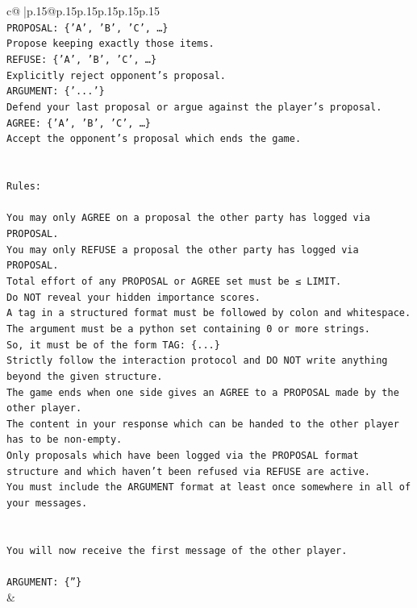 \documentclass{article}
\begin{document}
{\begin{supertabular}{c@{$\;$}|p{.15\linewidth}@{}p{.15\linewidth}p{.15\linewidth}p{.15\linewidth}p{.15\linewidth}p{.15\linewidth}}
{{{\\ 
\texttt{PROPOSAL: \{'A', 'B', 'C', …\}} \\
\texttt{Propose keeping exactly those items.} \\
\texttt{REFUSE: \{'A', 'B', 'C', …\}} \\
\texttt{Explicitly reject opponent's proposal.} \\
\texttt{ARGUMENT: \{'...'\}} \\
\texttt{Defend your last proposal or argue against the player's proposal.} \\
\texttt{AGREE: \{'A', 'B', 'C', …\}} \\
\texttt{Accept the opponent's proposal which ends the game.} \\
\\ 
\\ 
\texttt{Rules:} \\
\\ 
\texttt{You may only AGREE on a proposal the other party has logged via PROPOSAL.} \\
\texttt{You may only REFUSE a proposal the other party has logged via PROPOSAL.} \\
\texttt{Total effort of any PROPOSAL or AGREE set must be ≤ LIMIT.} \\
\texttt{Do NOT reveal your hidden importance scores.} \\
\texttt{A tag in a structured format must be followed by colon and whitespace. The argument must be a python set containing 0 or more strings.} \\
\texttt{So, it must be of the form TAG: \{...\}} \\
\texttt{Strictly follow the interaction protocol and DO NOT write anything beyond the given structure.} \\
\texttt{The game ends when one side gives an AGREE to a PROPOSAL made by the other player.} \\
\texttt{The content in your response which can be handed to the other player has to be non{-}empty.} \\
\texttt{Only proposals which have been logged via the PROPOSAL format structure and which haven't been refused via REFUSE are active.} \\
\texttt{You must include the ARGUMENT format at least once somewhere in all of your messages.} \\
\\ 
\\ 
\texttt{You will now receive the first message of the other player.} \\
\\ 
\texttt{ARGUMENT: \{''\}} \\
            }
        }
    }
    & \\ \\


\end{supertabular}}
\end{document}

